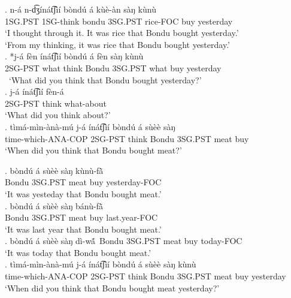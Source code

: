 \documentclass{assets/fieldnotes}
\begin{document}

\exg. n-á n-d͡ʒínát͡ʃìí bòndú á kùè-àn sàŋ kùnù\\
1SG.PST 1SG-think bondu 3SG.PST rice-FOC buy yesterday\\
`I thought through it. It was rice that Bondu bought yesterday.' \\  
`From my thinking, it was rice that Bondu bought yesterday.' \\ 

\exg. *j-á fèn ínát͡ʃìí bòndú á fèn sàŋ kùnù \\
2SG-PST what think Bondu 3SG.PST what buy yesterday\\\
`What did you think that Bondu bought yesterday?' \\  

\exg. j-á ínát͡ʃìí fèn-á \\
2SG-PST think what-about\\
`What did you think about?' \\  

\exg. tìmá-mìn-ànà-mú j-á ínát͡ʃìí bòndú á sùèè sàŋ \\
time-which-ANA-COP 2SG-PST think Bondu 3SG.PST meat buy\\
`When did you think that Bondu bought meat?'\\  


\exg. bòndú á sùèè sàŋ kùnù-fã̀\\
Bondu 3SG.PST meat buy yesterday-FOC\\
`It was yesteday that Bondu bought meat.'\\  

\exg. bòndú á sùèè sàŋ bánù-fã̀\\
Bondu 3SG.PST meat buy last.year-FOC\\
`It was last year that Bondu bought meat.'\\  

\exg. bòndú á sùèè sàŋ dì-wã́\
Bondu 3SG.PST meat buy today-FOC\\
`It was today that Bondu bought meat.'\\  

\exg. tìmá-mìn-ànà-mú j-á ínát͡ʃìí bòndú á sùèè sàŋ kùnù\\
time-which-ANA-COP 2SG-PST think Bondu 3SG.PST meat buy yesterday\\
`When did you think that Bondu bought meat yesterday?' \\ 
\end{document}
